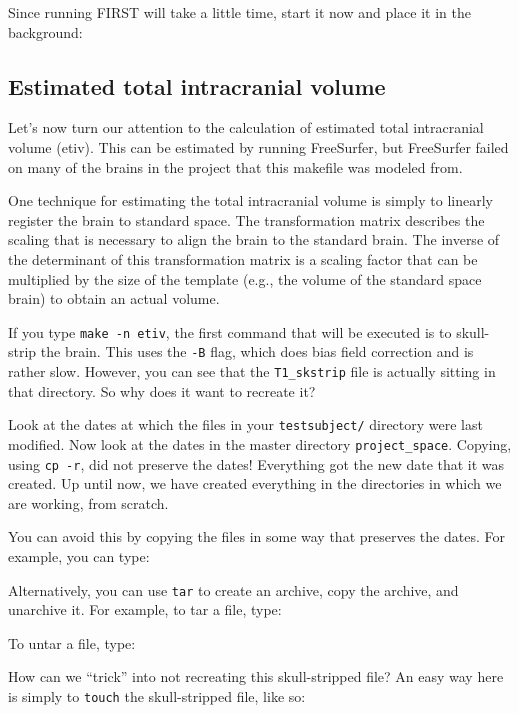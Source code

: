 Since running FIRST will take a little time, start it now and place it in the background:

\subsection{Estimated total intracranial volume}
Let's now turn our attention to the calculation of estimated total intracranial volume (etiv). This can be estimated by running FreeSurfer, but FreeSurfer failed on many of the brains in the project that this makefile was modeled from.

One technique for estimating the total intracranial volume is simply
to linearly register the brain to standard space. The transformation
matrix describes the scaling that is necessary to align the brain to
the standard brain. The inverse of the determinant of this
transformation matrix is a scaling factor that can be multiplied by the size of the template (e.g., the volume of the standard space brain) to obtain an actual volume.

If you type \texttt{make -n etiv}, the first command that will be executed is to skull-strip the brain. This uses the \texttt{-B} flag, which does bias field correction and is rather slow. However, you can see that the \texttt{T1_skstrip} file is actually sitting in that directory. So why does it want to recreate it?

Look at the dates at which the files in your \texttt{testsubject/} directory were last modified. Now look at the dates in the master directory \texttt{project_space}. Copying, using \texttt{cp -r}, did not preserve the dates! Everything got the new date that it was created. Up until now, we have created everything in the directories in which we are working, from scratch. 

You can avoid this by copying the files in some way that preserves the dates. For example,
you can type:

Alternatively, you can use \texttt{tar} to create an archive, copy the archive, and unarchive it.
For example, to tar a file, type:

To untar a file, type:

How can we ``trick'' \maken{} into not recreating this skull-stripped file? An easy way here is simply to \texttt{touch} the skull-stripped file, like so:

